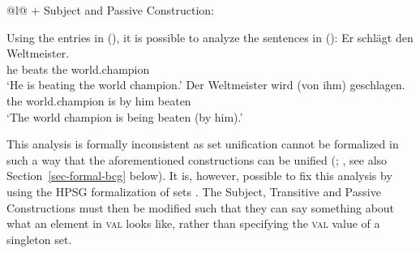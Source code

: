 \begin{tabular}[t]{@{}l@{}}
 $+$ Subject and Passive Construction:\\
\end{tabular}
\zl
Using the entries in (), it is possible to analyze the sentences in ():
\eal
\label{ex-cxg-weltmeister}
\ex 
\gll Er schlägt den Weltmeister.\\
	 he beats the world.champion\\
\glt `He is beating the world champion.'
\ex 
\gll Der Weltmeister wird (von ihm) geschlagen.\\
	 the world.champion is \spacebr{}by him beaten\\
\glt `The world champion is being beaten (by him).'
\zl

\noindent
This analysis is formally inconsistent as set unification cannot be formalized
in such a way that the aforementioned constructions can be unified (\citealp{Mueller2006d};
\citealp[Section~7.5.2]{MuellerLehrbuch1}, see also Section~\ref{sec-formal-bcg} below).
It is, however, possible to fix this analysis by using the HPSG formalization of sets \citep{ps,PM90a}.
The Subject, Transitive and Passive Constructions must then be modified such that they can say something about what
an element in \textsc{val} looks like, rather than specifying the \textsc{val} value of a singleton set.

